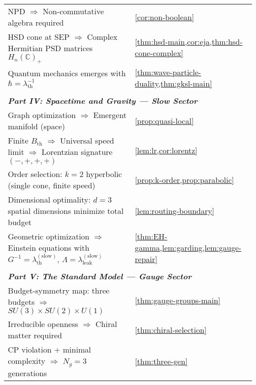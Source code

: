 {\begin{longtable}{p{10cm} p{4.5cm}}
NPD $\Rightarrow$ Non-commutative algebra required & \cref{cor:non-boolean} \\

HSD cone at SEP $\Rightarrow$ Complex Hermitian PSD matrices $H_n(\mathbb{C})_+$ & \cref{thm:hsd-main,cor:eja,thm:hsd-cone-complex} \\

Quantum mechanics emerges with $\hbar = \lambda_{\mathrm{th}}^{-1}$ & \cref{thm:wave-particle-duality,thm:gksl-main} \\
\hline

\multicolumn{2}{c}{\rule{0pt}{3ex}} \\

\multicolumn{2}{l}{\textit{\textbf{Part IV: Spacetime and Gravity — Slow Sector}}} \\
\hline
Graph optimization $\Rightarrow$ Emergent manifold (space) & \cref{prop:quasi-local} \\

Finite $B_{\mathrm{th}}$ $\Rightarrow$ Universal speed limit $\Rightarrow$ Lorentzian signature $(-, +, +, +)$ & \cref{lem:lr,cor:lorentz} \\

Order selection: $k=2$ hyperbolic (single cone, finite speed) & \cref{prop:k-order,prop:parabolic} \\

Dimensional optimality: $d=3$ spatial dimensions minimize total budget & \cref{lem:routing-boundary} \\

Geometric optimization $\Rightarrow$ Einstein equations with $G^{-1} = \lambda_{\mathrm{th}}^{(\text{slow})}$, $\Lambda = \lambda_{\mathrm{leak}}^{(\text{slow})}$ & \cref{thm:EH-gamma,lem:garding,lem:gauge-repair} \\
\hline

\multicolumn{2}{c}{\rule{0pt}{3ex}} \\

\multicolumn{2}{l}{\textit{\textbf{Part V: The Standard Model — Gauge Sector}}} \\
\hline
Budget-symmetry map: three budgets $\Rightarrow$ $SU(3) \times SU(2) \times U(1)$ & \cref{thm:gauge-groups-main} \\

Irreducible openness $\Rightarrow$ Chiral matter required & \cref{thm:chiral-selection} \\

CP violation + minimal complexity $\Rightarrow$ $N_g = 3$ generations & \cref{thm:three-gen} \\


\end{longtable}}
